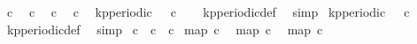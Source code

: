 \begin{isabellebody}
\ {\isacartoucheopen}c{}\ {}{\isacartoucheclose}\isanewline
{}\isamarkupfalse%
\ {\isacartoucheopen}c{}\ {}{\isacartoucheclose}\isanewline
{}\isamarkupfalse%
\ {\isacartoucheopen}c{}\ {}{\isacartoucheclose}\isanewline
{}\isamarkupfalse%
\ {\isacartoucheopen}c{}\ {}{\isacartoucheclose}\isanewline
\isanewline
{}\isamarkupfalse%
\ {\isacartoucheopen}kp{\isacharunderscore}periodic\ {}\ {}\ c{}{\isacartoucheclose}\isanewline
%
\isadelimproof
\ \ %
\endisadelimproof
%
\isatagproof
{}\isamarkupfalse%
\ kp{\isacharunderscore}periodic{\isacharunderscore}def\ \isamarkupfalse%
\ simp%
\endisatagproof
{\isafoldproof}%
%
\isadelimproof
\isanewline
%
\endisadelimproof
\isanewline
{}\isamarkupfalse%
\ {\isacartoucheopen}kp{\isacharunderscore}periodic\ {}\ {}\ c{}{\isacartoucheclose}\isanewline
%
\isadelimproof
\ \ %
\endisadelimproof
%
\isatagproof
{}\isamarkupfalse%
\ kp{\isacharunderscore}periodic{\isacharunderscore}def\ \isamarkupfalse%
\ simp%
\endisatagproof
{\isafoldproof}%
%
\isadelimproof
\isanewline
%
\endisadelimproof
\isanewline
{}\isamarkupfalse%
\ {\isacartoucheopen}c{}\ {\isasymequiv}\ c{}\ {\isasymoplus}\ c{}{\isacartoucheclose}\isanewline
\isanewline
{}\isamarkupfalse%
\ {\isacartoucheopen}map\ c{}\ {\isacharbrackleft}{}{\isacharcomma}{}{\isacharcomma}{}{\isacharcomma}{}{\isacharcomma}{}{\isacharcomma}{}{\isacharcomma}{}{\isacharcomma}{}{\isacharcomma}{}{\isacharcomma}{}{\isacharcomma}{}{}{\isacharbrackright}{\isacartoucheclose}\isanewline
{}\isamarkupfalse%
\ {\isacartoucheopen}map\ c{}\ {\isacharbrackleft}{}{\isacharcomma}{}{\isacharcomma}{}{\isacharcomma}{}{\isacharcomma}{}{\isacharcomma}{}{\isacharcomma}{}{\isacharcomma}{}{\isacharcomma}{}{\isacharcomma}{}{\isacharcomma}{}{}{\isacharbrackright}{\isacartoucheclose}\isanewline
{}\isamarkupfalse%
\ {\isacartoucheopen}map\ c{}\ {\isacharbrackleft}{}{\isacharcomma}{}{\isacharcomma}{}{\isacharcomma}{}{\isacharcomma}{}{\isacharcomma}{}{\isacharcomma}{}{\isacharcomma}{}{\isacharcomma}{}{\isacharcomma}{}{\isacharcomma}{}{}{\isacharbrackright}{\isacartoucheclose}\isanewline

\end{isabellebody}
